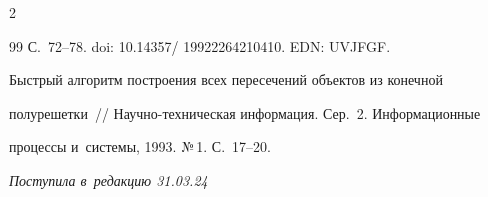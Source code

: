 \begin{multicols}{2}
{{\begin{thebibliography}{99}
С.~72--78.  doi: 10.14357/ 19922264210410. EDN: UVJFGF.







 Быстрый алгоритм построения всех пересечений объектов из конечной 


полурешетки~// На\-уч\-но-тех\-ни\-че\-ская информация. Сер.~2. Информационные 


процессы и~системы, 1993. №\,1. С.~17--20. 


\end{thebibliography}





 }


 }





\end{multicols}





\vspace*{-6pt}





\hfill{\small\textit{Поступила в~редакцию 31.03.24}}















\newpage





\vspace*{-28pt}























\def\tit{CORRECT SUPERVISED CLASSIFICATION:\\ JSM-METHOD OVER~PRODUCT 


OF~PARTIAL ORDERS}








